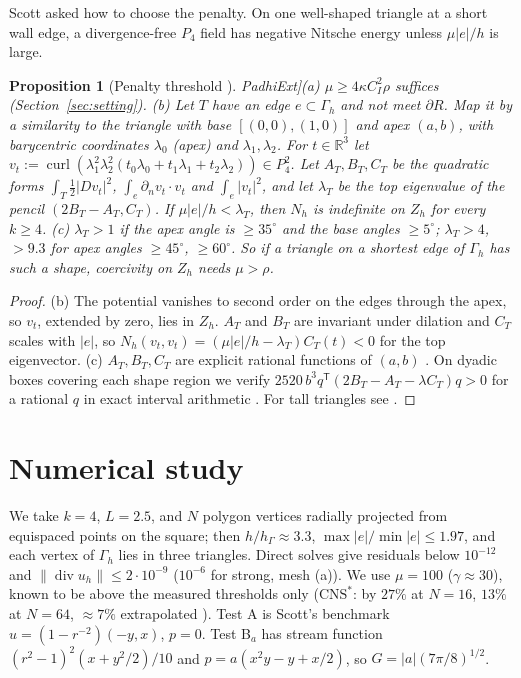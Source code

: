 \documentclass[5p,times]{elsarticle}
\newtheorem{proposition}[theorem]{Proposition}
\theoremstyle{definition}
\newcommand{\R}{\mathbb R}
\newcommand{\hG}{h_\Gamma}
\newcommand{\Gh}{\Gamma_h}
\newcommand{\Zh}{Z_h}
\newcommand{\dn}{\partial_n}
\newcommand{\norm}[1]{\lVert #1\rVert}
\newcommand{\CNS}{\mathrm{CNS}^\ast}
\newcommand{\curl}{\operatorname{curl}}
\renewcommand{\div}{\operatorname{div}}
\newcommand{\ext}[1]{\cite[#1]{PadhiExt}}
\begin{document}
Scott asked how to choose the penalty. On one well-shaped triangle at a short wall edge, a divergence-free $P_4$ field has negative Nitsche energy unless $\mu|e|/h$ is large.

\begin{proposition}[Penalty threshold \ext{\S10}]\label{prop:penalty}
(a) $\mu\ge4\kappa C_I^2\rho$ suffices (Section~\ref{sec:setting}). (b) Let $T$ have an edge $e\subset\Gh$ and not meet $\partial R$. Map it by a similarity to the triangle with base $[(0,0),(1,0)]$ and apex $(a,b)$, with barycentric coordinates $\lambda_0$ (apex) and $\lambda_1,\lambda_2$. For $t\in\R^3$ let $v_t:=\curl(\lambda_1^2\lambda_2^2(t_0\lambda_0+t_1\lambda_1+t_2\lambda_2))\in P_4^2$. Let $A_T,B_T,C_T$ be the quadratic forms $\int_T\frac12|Dv_t|^2$, $\int_e\dn v_t\cdot v_t$ and $\int_e|v_t|^2$, and let $\lambda_T$ be the top eigenvalue of the pencil $(2B_T-A_T,C_T)$. If $\mu|e|/h<\lambda_T$, then $N_h$ is indefinite on $\Zh$ for every $k\ge4$. (c) $\lambda_T>1$ if the apex angle is $\ge35^\circ$ and the base angles $\ge5^\circ$; $\lambda_T>4$, $>9.3$ for apex angles $\ge45^\circ$, $\ge60^\circ$. So if a triangle on a shortest edge of $\Gh$ has such a shape, coercivity on $\Zh$ needs $\mu>\rho$.
\end{proposition}

\begin{proof}
(b) The potential vanishes to second order on the edges through the apex, so $v_t$, extended by zero, lies in $\Zh$. $A_T$ and $B_T$ are invariant under dilation and $C_T$ scales with $|e|$, so $N_h(v_t,v_t)=(\mu|e|/h-\lambda_T)C_T(t)<0$ for the top eigenvector. (c) $A_T,B_T,C_T$ are explicit rational functions of $(a,b)$ \ext{\S10.1}. On dyadic boxes covering each shape region we verify $2520\,b^3q^{\mathsf T}(2B_T-A_T-\lambda C_T)q>0$ for a rational $q$ in exact interval arithmetic \ext{Prop.~10.3}. For tall triangles see \ext{Prop.~10.6, Thm.~10.13}.
\end{proof}

\section{Numerical study}\label{sec:num}

We take $k=4$, $L=2.5$, and $N$ polygon vertices radially projected from equispaced points on the square; then $h/\hG\approx3.3$, $\max|e|/\min|e|\le1.97$, and each vertex of $\Gh$ lies in three triangles. Direct solves give residuals below $10^{-12}$ and $\norm{\div u_h}\le2\cdot10^{-9}$ ($10^{-6}$ for strong, mesh (a)). We use $\mu=100$ ($\gamma\approx30$), known to be above the measured thresholds only ($\CNS$: by $27\%$ at $N=16$, $13\%$ at $N=64$, ${\approx}7\%$ extrapolated \ext{Rem.~15.18}). Test A is Scott's benchmark $u=(1-r^{-2})(-y,x)$, $p=0$. Test B$_a$ has stream function $(r^2-1)^2(x+y^2/2)/10$ and $p=a(x^2y-y+x/2)$, so $G=|a|(7\pi/8)^{1/2}$.
\end{document}
